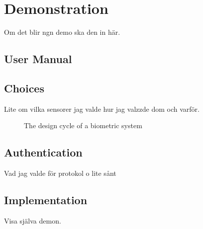 \chapter{Demonstration}\label{cha:demo}
Om det blir ngn demo ska den in här.

\section{User Manual}\label{manual}

\section{Choices}
Lite om vilka sensorer jag valde hur jag valzzde dom och varför.
\begin{figure}[!ht]
	
	\caption{\label{fig:appDesign} The design cycle of a biometric system}
\end{figure}

\section{Authentication}
Vad jag valde för protokol o lite sånt

\section{Implementation}
Visa själva demon.


